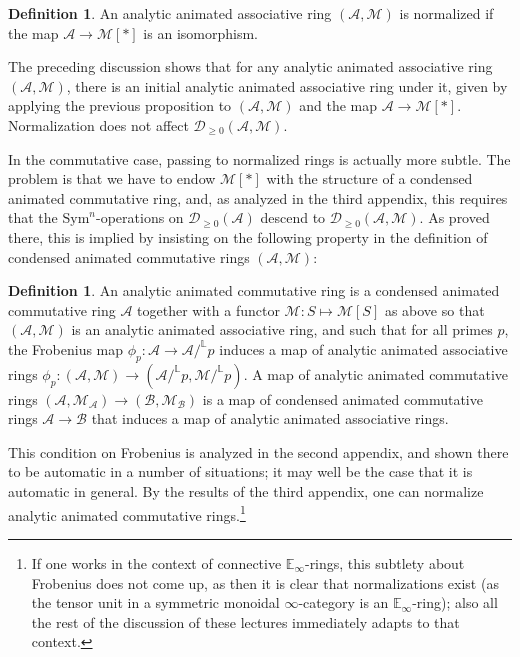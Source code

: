 \documentclass[11pt]{amsbook}
\numberwithin{equation}{section}
\numberwithin{theorem}{section}
\theoremstyle{definition}
\newtheorem{definition}[theorem]{Definition}
\begin{document}
\begin{definition} An analytic animated associative ring $(\mathcal A,\mathcal M)$ is normalized if the map $\mathcal A\to \mathcal M[\ast]$ is an isomorphism.
\end{definition}

The preceding discussion shows that for any analytic animated associative ring $(\mathcal A,\mathcal M)$, there is an initial analytic animated associative ring under it, given by applying the previous proposition to $(\mathcal A,\mathcal M)$ and the map $\mathcal A\to \mathcal M[\ast]$. Normalization does not affect $\mathcal D_{\geq 0}(\mathcal A,\mathcal M)$.

In the commutative case, passing to normalized rings is actually more subtle. The problem is that we have to endow $\mathcal M[\ast]$ with the structure of a condensed animated commutative ring, and, as analyzed in the third appendix, this requires that the $\mathrm{Sym}^n$-operations on $\mathcal D_{\geq 0}(\mathcal A)$ descend to $\mathcal D_{\geq 0}(\mathcal A,\mathcal M)$. As proved there, this is implied by insisting on the following property in the definition of condensed animated commutative rings $(\mathcal A,\mathcal M)$:

\begin{definition} An analytic animated commutative ring is a condensed animated commutative ring $\mathcal A$ together with a functor $\mathcal M: S\mapsto \mathcal M[S]$ as above so that $(\mathcal A,\mathcal M)$ is an analytic animated associative ring, and such that for all primes $p$, the Frobenius map $\phi_p: \mathcal A\to \mathcal A/^{\mathbb L} p$ induces a map of analytic animated associative rings $\phi_p: (\mathcal A,\mathcal M)\to (\mathcal A/^{\mathbb L} p,\mathcal M/^{\mathbb L} p)$. A map of analytic animated commutative rings $(\mathcal A,\mathcal M_{\mathcal A})\to (\mathcal B,\mathcal M_{\mathcal B})$ is a map of condensed animated commutative rings $\mathcal A\to \mathcal B$ that induces a map of analytic animated associative rings.
\end{definition}

This condition on Frobenius is analyzed in the second appendix, and shown there to be automatic in a number of situations; it may well be the case that it is automatic in general. By the results of the third appendix, one can normalize analytic animated commutative rings.\footnote{If one works in the context of connective $\mathbb E_\infty$-rings, this subtlety about Frobenius does not come up, as then it is clear that normalizations exist (as the tensor unit in a symmetric monoidal $\infty$-category is an $\mathbb E_\infty$-ring); also all the rest of the discussion of these lectures immediately adapts to that context.}
\end{document}
